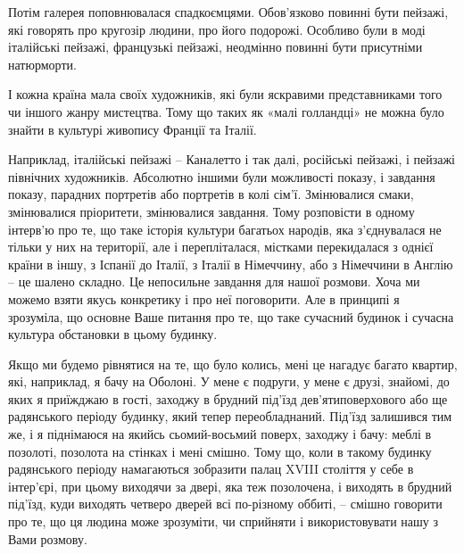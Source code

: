 
Потім
галерея поповнювалася спадкоємцями. Обов'язково повинні бути пейзажі, які
говорять про кругозір людини, про його подорожі. Особливо були в моді
італійські пейзажі, французькі пейзажі, неодмінно повинні бути присутніми
натюрморти. 

І кожна країна мала своїх художників, які були яскравими
представниками того чи іншого жанру мистецтва. Тому що таких як «малі
голландці» не можна було знайти в культурі живопису Франції та Італії.

Наприклад, італійські пейзажі – Каналетто і так далі, російські пейзажі, і
пейзажі північних художників. Абсолютно іншими були можливості показу, і
завдання показу, парадних портретів або портретів в колі сім'ї. Змінювалися
смаки, змінювалися пріоритети, змінювалися завдання. Тому розповісти в одному
інтерв'ю про те, що таке історія культури багатьох народів, яка з'єднувалася не
тільки у них на території, але і перепліталася, містками перекидалася з однієї
країни в іншу, з Іспанії до Італії, з Італії в Німеччину, або з Німеччини в
Англію – це шалено складно. Це непосильне завдання для нашої розмови. Хоча ми
можемо взяти якусь конкретику і про неї поговорити. Але в принципі я зрозуміла,
що основне Ваше питання про те, що таке сучасний будинок і сучасна культура
обстановки в цьому будинку.

Якщо ми будемо рівнятися на те, що було колись, мені це нагадує багато квартир,
які, наприклад, я бачу на Оболоні. У мене є подруги, у мене є друзі, знайомі,
до яких я приїжджаю в гості, заходжу в брудний під'їзд дев'ятиповерхового або
ще радянського періоду будинку, який тепер переобладнаний. Під'їзд залишився
тим же, і я піднімаюся на якийсь сьомий-восьмий поверх, заходжу і бачу: меблі в
позолоті, позолота на стінках і мені смішно. Тому що, коли в такому будинку
радянського періоду намагаються зобразити палац XVIII століття у себе в
інтер'єрі, при цьому виходячи за двері, яка теж позолочена, і виходять в
брудний під'їзд, куди виходять четверо дверей всі по-різному оббиті, – смішно
говорити про те, що ця людина може зрозуміти, чи сприйняти і використовувати
нашу з Вами розмову. 


